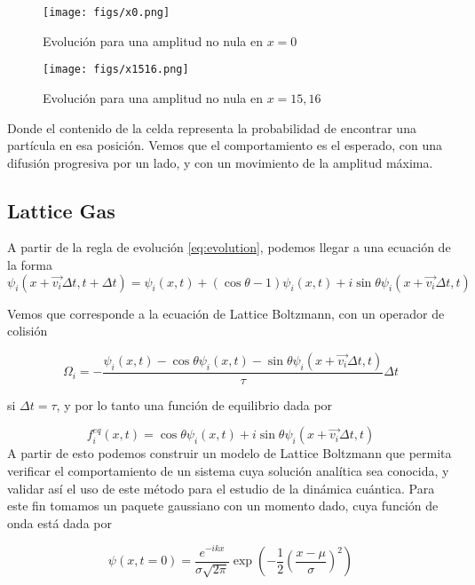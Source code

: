 \documentclass[12pts, letterpaper]{article}
\begin{document}
\begin{figure*}[h]
    \centering
    \texttt{[image: figs/x0.png]}
    \caption{Evolución para una amplitud no nula en $x=0$}
    \label{fig:x0}
\end{figure*}

\begin{figure*}[h]
    \centering
    \texttt{[image: figs/x1516.png]}
    \caption{Evolución para una amplitud no nula en $x=15,16$}
    \label{fig:x15}
\end{figure*}

Donde el contenido de la celda representa la probabilidad de encontrar una partícula en 
esa posición. Vemos que el comportamiento es el esperado, con una difusión progresiva por 
un lado, y con un movimiento de la amplitud máxima.

\subsection{Lattice Gas}
A partir de la regla de evolución \ref{eq:evolution}, podemos llegar a una ecuación de la 
forma 
\begin{equation}\label{eq:QLG}
    \psi_i(x+\vec{v_i}\Delta t, t +\Delta t) = \psi_i(x,t) + (\cos\theta -1)\psi_i(x,t)
    + i\sin\theta\psi_i(x+\vec{v_i}\Delta t,t)
\end{equation}

Vemos que corresponde a la ecuación de Lattice Boltzmann, con un operador de colisión 

\begin{equation*}
    \Omega_i = -\frac{\psi_i(x,t)-\cos\theta\psi_i(x,t)
    -\sin\theta\psi_i(x+\vec{v_i}\Delta t,t)}{\tau}\Delta t
\end{equation*}

si $\Delta t = \tau$, y por lo tanto una función de equilibrio dada por

\begin{equation*}
    f_i^{eq}(x,t)=\cos\theta\psi_i(x,t)+i\sin\theta\psi_i(x+\vec{v_i}\Delta t,t)
\end{equation*}
A partir de esto podemos construir un modelo de Lattice Boltzmann que permita verificar el
comportamiento de un sistema cuya solución analítica sea conocida, y validar así el uso de 
este método para el estudio de la dinámica cuántica. Para este fin tomamos un paquete 
gaussiano con un momento dado, cuya función de onda está dada por

\begin{equation*}
    \psi(x,t=0)=\frac{e^{-ikx}}{\sigma\sqrt{2\pi}}\exp{\left(-\frac{1}{2}\left(
        \frac{x-\mu}{\sigma}\right)^2\right)}
\end{equation*}
\end{document}
